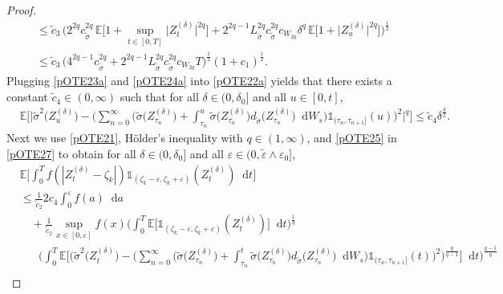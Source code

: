 \documentclass[11pt,a4paper]{article}
\numberwithin{equation}{section}
\theoremstyle{definition}
\newcommand{\E}{{\mathbb{E}}}
\newcommand{\diff}{\mathop{}\!\mathrm{d}}
\begin{document}
\begin{proof}
\begin{equation}
\begin{aligned}
    &\leq \widetilde c_3\, \Big( 2^{2q} c_{\widetilde\sigma}^{2q} \,\E\Big[ 1+\sup_{t\in[0,T]} \big| Z^{(\delta)}_{t}\big|^{2q} \Big]
    +2^{2q-1} L_{\widetilde\sigma}^{2q} c_{\widetilde\sigma}^{2q} c_{W_{2q}} \delta^q\, \E\Big[ 1+ \big| Z^{(\delta)}_{\underline u}\big|^{2q}\Big]\Big)^{\frac{1}{2}}\\
    &\leq \widetilde c_3\, \Big( 4^{2q-1}  c_{\widetilde\sigma}^{2q} 
    +2^{2q-1} L_{\widetilde\sigma}^{2q} c_{\widetilde\sigma}^{2q} c_{W_{2q}} T \Big)^{\frac{1}{2}}(1+c_1)^\frac{1}{2} .
    \end{aligned}
\end{equation}
Plugging \eqref{pOTE23a} and \eqref{pOTE24a} into \eqref{pOTE22a} yields that there exists a constant $\widetilde c_4\in(0,\infty)$ such that for all $\delta \in(0,\delta_0]$ and all $u\in[0,t]$,
\begin{equation}\label{pOTE25}
    \begin{aligned}
    &\E\Big[ \Big| \widetilde\sigma^2\big(Z^{(\delta)}_{u} \big)- \Big(\sum_{n=0}^{\infty} \Big( \widetilde\sigma \big(Z^{(\delta)}_{\tau_n}\big) + \int_{\tau_n}^u \widetilde\sigma \big(Z^{(\delta)}_{\tau_n}\big)d_{\widetilde\sigma} \big(Z^{(\delta)}_{\tau_n}\big)\diff W_s \Big)\mathds{1}_{(\tau_n,\tau_{n+1}]}(u) \Big)^2\Big|^q\Big]
    \leq \widetilde c_4 \delta^{\frac{q}{2}}.
    \end{aligned}
\end{equation}
Next we use \eqref{pOTE21}, Hölder's inequality with $q\in(1,\infty)$, and \eqref{pOTE25} in \eqref{pOTE27} to obtain for all $\delta \in(0,\delta_0]$ and all $\varepsilon \in(0, \widetilde \varepsilon \wedge \varepsilon_0]$,
\begin{equation}\label{pOTE28}
    \begin{aligned}
        &\E\Big[\int_0^T f(|Z^{(\delta)}_{t}-\zeta_k|)\mathds{1}_{(\zeta_k-\varepsilon, \zeta_k+\varepsilon)}(Z^{(\delta)}_{t}) \diff 
        t \Big]\\
        &\leq \frac{1}{\widetilde c_2}2 c_4\int_0^{\varepsilon} f(a) \diff a\\
        &\quad +  \frac{1}{\widetilde c_2}  \sup_{x\in[0,\varepsilon]} f(x)  \Big(\int_0^T\E\Big[ \mathds{1}_{(\zeta_k-\varepsilon, \zeta_k+\varepsilon)}(Z^{(\delta)}_{t}) \Big] \diff t \Big)^\frac{1}{q}\\
        &\quad\,\,\,\, \Big(\int_0^T \E\Big[\Big( \widetilde\sigma^2 \big(Z^{(\delta)}_{t}\big) - \Big(\sum_{n=0}^{\infty} \Big( \widetilde\sigma \big(Z^{(\delta)}_{\tau_n}\big) + \int_{\tau_n}^t \widetilde\sigma \big(Z^{(\delta)}_{\tau_n}\big)d_{\widetilde\sigma} \big(Z^{(\delta)}_{\tau_n}\big)\diff W_s \Big)\mathds{1}_{(\tau_n,\tau_{n+1}]}(t) \Big)^{2} \Big)^{\frac{q}{q-1}}\Big]\diff t\Big)^{\frac{q-1}{q}}  \\

\end{aligned}
\end{equation}
\end{proof}
\end{document}
